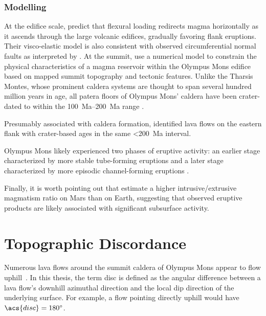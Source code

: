 \subsubsection{Modelling}

At the edifice scale, \textcite{mcgovern_state_1993} predict that flexural loading redirects magma horizontally as it ascends through the large volcanic edifices, gradually favoring flank eruptions. Their visco-elastic model is also consistent with observed circumferential normal faults as interpreted by \textcite{thomas_flank_1990}. At the summit, \textcite{zuber_caldera_1992} use a numerical model to constrain the physical characteristics of a magma reservoir within the Olympus Mons edifice based on mapped summit topography and tectonic features. Unlike the Tharsis Montes, whose prominent caldera systems are thought to span several hundred million years in age, all patera floors of Olympus Mons' caldera have been crater-dated to within the \qtyrange{100}{200}{Ma} range \parencite{neukum_recent_2004}.

Presumably associated with caldera formation, \textcite{basilevsky_geologically_2006} identified lava flows on the eastern flank with crater-based ages in the same \qty{<200}{Ma} interval.

Olympus Mons likely experienced two phases of eruptive activity: an earlier stage characterized by more stable tube-forming eruptions and a later stage characterized by more episodic channel-forming eruptions \parencite{bleacher_olympus_2007,peters_flank_2017}. 

Finally, it is worth pointing out that \textcite[e.g.,][]{black_eruptibility_2016} estimate a higher intrusive/extrusive magmatism ratio on Mars than on Earth, suggesting that observed eruptive products are likely associated with significant subsurface activity. 

\section{Topographic Discordance}

Numerous lava flows around the summit caldera of Olympus Mons appear to flow uphill~\parencite[Figure~\ref{fig:uphill-flows}; after][]{mouginis-mark_late-stage_2019}. In this thesis, the term \ac{disc} is defined as the angular difference between a lava flow's downhill azimuthal direction and the local dip direction of the underlying surface. For example, a flow pointing directly uphill would have $\acs{disc}=\ang{180}$. 

